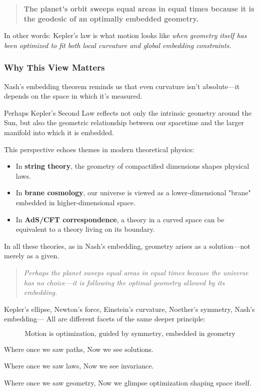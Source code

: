 \begin{tcolorbox}[colback=blue!5!white, colframe=blue!50!black, title={Kepler’s Second Law as an Optimal Path}]
\begin{quote}
\textbf{The planet’s orbit sweeps equal areas in equal times  
because it is the geodesic of an optimally embedded geometry.}
\end{quote}
\end{tcolorbox}

In other words:  
Kepler’s law is what motion looks like \emph{when geometry itself has been optimized to fit both local curvature and global embedding constraints.}

\subsubsection*{Why This View Matters}

Nash’s embedding theorem reminds us that even curvature isn’t absolute—it depends on the space in which it’s measured.

Perhaps Kepler’s Second Law reflects not only the intrinsic geometry around the Sun,  
but also the geometric relationship between our spacetime and the larger manifold into which it is embedded.

This perspective echoes themes in modern theoretical physics:

\begin{itemize}
  \item In \textbf{string theory}, the geometry of compactified dimensions shapes physical laws.
  \item In \textbf{brane cosmology}, our universe is viewed as a lower-dimensional "brane" embedded in higher-dimensional space.
  \item In \textbf{AdS/CFT correspondence}, a theory in a curved space can be equivalent to a theory living on its boundary.
\end{itemize}

In all these theories, as in Nash’s embedding, geometry arises as a solution—not merely as a given.

\begin{quote}
\textit{Perhaps the planet sweeps equal areas in equal times  
because the universe has no choice—it is following the optimal geometry allowed by its embedding.}
\end{quote}

Kepler’s ellipse, Newton’s force, Einstein’s curvature, Noether’s symmetry, Nash’s embedding—  
All are different facets of the same deeper principle:

\begin{tcolorbox}[colback=blue!5!white, colframe=blue!50!black, title={The Universe as an Optimized Geometry}]
\[
\boxed{
\text{Motion is optimization, guided by symmetry, embedded in geometry}
}
\]
\end{tcolorbox}

Where once we saw paths,  
Now we see solutions.

Where once we saw laws,  
Now we see invariance.

Where once we saw geometry,  
Now we glimpse optimization shaping space itself.
